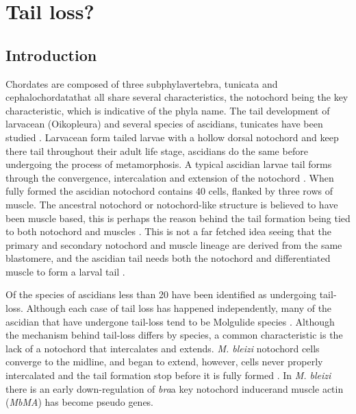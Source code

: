 \chapter{Tail loss?}

\section{Introduction}


Chordates are composed of three subphyla\textemdash vertebra, tunicata and cephalochordata\textemdash that all share several characteristics, the notochord being the key characteristic, which is indicative of the phyla name. The tail development of larvacean (Oikopleura) and several species of ascidians, tunicates have been studied \cite{jeffery_factors_1992,nakatani_mutations_1999,kugler_evolutionary_2011}. Larvacean form tailed larvae with a hollow dorsal notochord and keep there tail throughout their adult life stage, ascidians do the same before undergoing the process of metamorphosis. A typical ascidian larvae tail forms through the convergence, intercalation and extension of the notochord \cite{swalla_mechanisms_1993}. When fully formed the ascidian notochord contains 40 cells, flanked by three rows of muscle. The ancestral notochord or notochord-like structure is believed to have been muscle based, this is perhaps the reason behind the tail formation being tied to both notochord and muscles \cite{lauri_development_2014}. This is not a far fetched idea seeing that the primary and secondary notochord and muscle lineage are derived from the same blastomere, and the ascidian tail needs both the notochord and differentiated muscle to form a larval tail \cite{nishida_cell_1987,di_gregorio_tail_2002}.

Of the  species of ascidians less than 20 have been identified as undergoing tail-loss. Although each case of tail loss has happened independently, many of the ascidian that have undergone tail-loss tend to be Molgulide species \cite{berrill_studies_1931,huber_evolution_2000}. Although the mechanism behind tail-loss differs by species, a common characteristic is the lack of a notochord that intercalates and extends. \textit{M. bleizi} notochord cells converge to the midline, and began to extend, however, cells never properly intercalated and the tail formation stop before it is fully formed \cite{jeffery_evolution_1999}. In \textit{M. bleizi} there is an early down-regulation of \textit{bra}\textemdash a key notochord inducer\textemdash and muscle actin (\textit{MbMA}) has become pseudo genes.   

